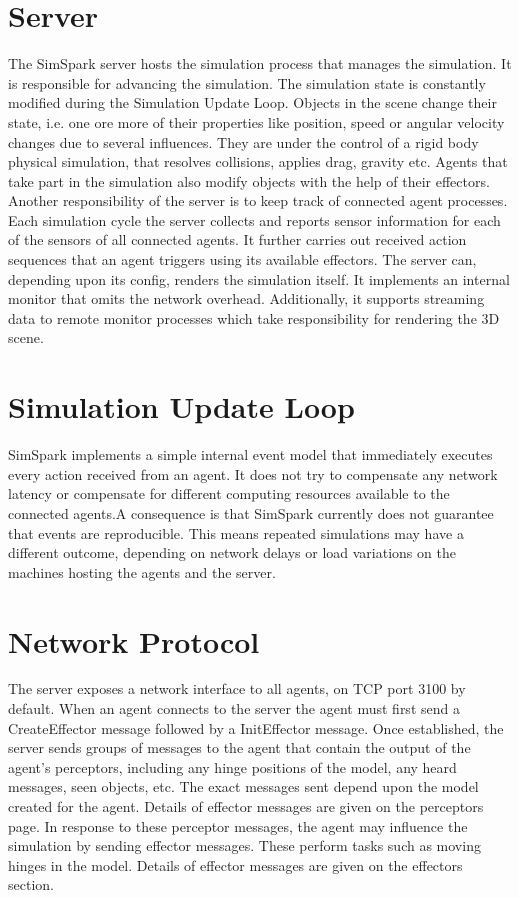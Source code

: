 \section{Server}
The SimSpark server hosts the simulation process that manages the simulation. It is responsible for advancing the simulation. The simulation state is constantly modified during the Simulation Update Loop.
Objects in the scene change their state, i.e. one ore more of their properties like position, speed or angular velocity changes due to several influences. They are under the control of a rigid body physical simulation, that resolves collisions, applies drag, gravity etc. Agents that take part in the simulation also modify objects with the help of their effectors.
Another responsibility of the server is to keep track of connected agent processes. Each simulation cycle the server collects and reports sensor information for each of the sensors of all connected agents. It further carries out received action sequences that an agent triggers using its available effectors.
The server can, depending upon its config, renders the simulation itself. It implements an internal monitor that omits the network overhead. Additionally, it supports streaming data to remote monitor processes which take responsibility for rendering the 3D scene.
\section{Simulation Update Loop}
SimSpark implements a simple internal event model that immediately executes every action received from an agent. It does not try to compensate any network latency or compensate for different computing resources available to the connected agents.A consequence is that SimSpark currently does not guarantee that events are reproducible. This means repeated simulations may have a different outcome, depending on network delays or load variations on the machines hosting the agents and the server.
\section{Network Protocol}
The server exposes a network interface to all agents, on TCP port 3100 by default.
When an agent connects to the server the agent must first send a CreateEffector message followed by a InitEffector message.
Once established, the server sends groups of messages to the agent that contain the output of the agent's perceptors, including any hinge positions of the model, any heard messages, seen objects, etc. The exact messages sent depend upon the model created for the agent. Details of effector messages are given on the perceptors page. In response to these perceptor messages, the agent may influence the simulation by sending effector messages. These perform tasks such as moving hinges in the model. Details of effector messages are given on the effectors section.
